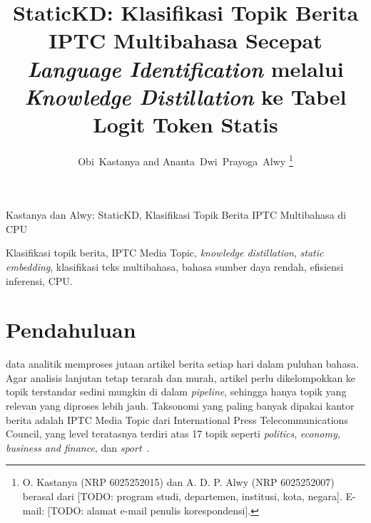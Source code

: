 \documentclass[journal]{IEEEtran}
\DeclareRobustCommand{\todo}[1]{{\color{red}[TODO: #1]}}
\newcommand{\eng}[1]{\textit{#1}}   %
\begin{document}
\title{StaticKD: Klasifikasi Topik Berita IPTC Multibahasa Secepat \eng{Language Identification} melalui \eng{Knowledge Distillation} ke Tabel Logit Token Statis}

\author{Obi~Kastanya and Ananta~Dwi~Prayoga~Alwy%
\thanks{O. Kastanya (NRP 6025252015) dan A. D. P. Alwy (NRP 6025252007) berasal dari \todo{program studi, departemen, institusi, kota, negara}. E-mail: \todo{alamat e-mail penulis korespondensi}.}}

%
{Kastanya dan Alwy: StaticKD, Klasifikasi Topik Berita IPTC Multibahasa di CPU}

\maketitle

\begin{abstract}

\end{abstract}

\begin{IEEEkeywords}
Klasifikasi topik berita, IPTC Media Topic, \eng{knowledge distillation}, \eng{static embedding}, klasifikasi teks multibahasa, bahasa sumber daya rendah, efisiensi inferensi, CPU.
\end{IEEEkeywords}

\section{Pendahuluan}
 data analitik memproses jutaan artikel berita setiap hari dalam puluhan bahasa. Agar analisis lanjutan tetap terarah dan murah, artikel perlu dikelompokkan ke topik terstandar sedini mungkin di dalam \eng{pipeline}, sehingga hanya topik yang relevan yang diproses lebih jauh. Taksonomi yang paling banyak dipakai kantor berita adalah IPTC Media Topic dari International Press Telecommunications Council, yang level teratasnya terdiri atas 17 topik seperti \eng{politics}, \eng{economy, business and finance}, dan \eng{sport}~\cite{iptc2024mediatopics,kuzman2025llm}.
\end{document}

